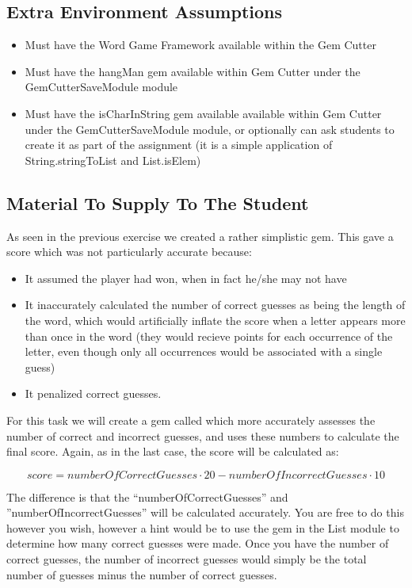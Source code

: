 	\subsection*{Extra Environment Assumptions}
		\begin{itemize}
			\item Must have the Word Game Framework available within the Gem Cutter
			\item Must have the hangMan gem available within Gem Cutter under the GemCutterSaveModule module
			\item Must have the isCharInString gem available available within Gem Cutter under the GemCutterSaveModule module, or optionally can ask students to create it as part of the assignment (it is a simple application of String.stringToList and List.isElem)
		\end{itemize}

\subsection*{Material To Supply To The Student}

As seen in the previous exercise we created a rather simplistic  gem.  This gave a score which was not particularly accurate because:

\begin{itemize}
	\item It assumed the player had won, when in fact he/she may not have
	\item It inaccurately calculated the number of correct guesses as being the length of the word, which would artificially inflate the score when a letter appears more than once in the word (they would recieve points for each occurrence of the letter, even though only all occurrences would be associated with a single guess)
	\item It penalized correct guesses.
\end{itemize}

For this task we will create a gem called  which more accurately assesses the number of correct and incorrect guesses, and uses these numbers to calculate the final score.  Again, as in the last case, the score will be calculated as:

\begin{equation}
score = numberOfCorrectGuesses \cdot 20 - numberOfIncorrectGuesses \cdot 10
\end{equation}

The difference is that the ``numberOfCorrectGuesses'' and ''numberOfIncorrectGuesses'' will be calculated accurately.  You are free to do this however you wish, however a hint would be to use the  gem in the List module to determine how many correct guesses were made.  Once you have the number of correct guesses, the number of incorrect guesses would simply be the total number of guesses minus the number of correct guesses.

